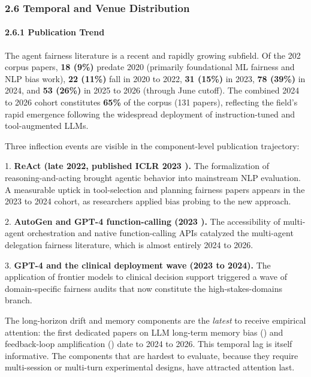 \documentclass[10pt]{article}
\begin{document}
\subsubsection*{2.6 Temporal and Venue Distribution}

\paragraph*{2.6.1 Publication Trend}

The agent fairness literature is a recent and rapidly growing subfield. Of the 202 corpus papers, \textbf{18 (9\%)} predate 2020 (primarily foundational ML fairness and NLP bias work), \textbf{22 (11\%)} fall in 2020 to 2022, \textbf{31 (15\%)} in 2023, \textbf{78 (39\%)} in 2024, and \textbf{53 (26\%)} in 2025 to 2026 (through June cutoff). The combined 2024 to 2026 cohort constitutes \textbf{65\%} of the corpus (131 papers), reflecting the field's rapid emergence following the widespread deployment of instruction-tuned and tool-augmented LLMs.

Three inflection events are visible in the component-level publication trajectory:

1. \textbf{ReAct (late 2022, published ICLR 2023 \cite{yao2023react}).} The formalization of reasoning-and-acting brought agentic behavior into mainstream NLP evaluation. A measurable uptick in tool-selection and planning fairness papers appears in the 2023 to 2024 cohort, as researchers applied bias probing to the new approach.

2. \textbf{AutoGen and GPT-4 function-calling (2023 \cite{wu2023autogen}).} The accessibility of multi-agent orchestration and native function-calling APIs catalyzed the multi-agent delegation fairness literature, which is almost entirely 2024 to 2026.

3. \textbf{GPT-4 and the clinical deployment wave (2023 to 2024).} The application of frontier models to clinical decision support \cite{omar2025sociodemographic,poulain2024bias,zack2024coding} triggered a wave of domain-specific fairness audits that now constitute the high-stakes-domains branch.

The long-horizon drift and memory components are the \emph{latest} to receive empirical attention: the first dedicated papers on LLM long-term memory bias (\cite{ma2026implicit}) and feedback-loop amplification (\cite{wyllie2024fairness,wang2026observations}) date to 2024 to 2026. This temporal lag is itself informative. The components that are hardest to evaluate, because they require multi-session or multi-turn experimental designs, have attracted attention last.
\end{document}
